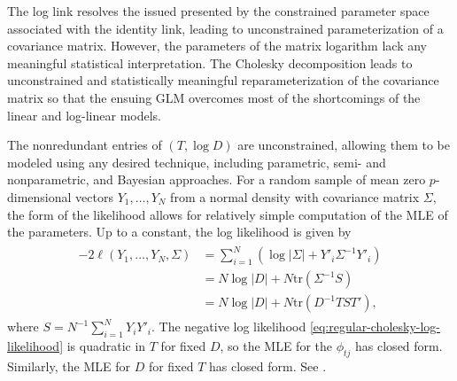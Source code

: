 The log link resolves the issued presented by the constrained parameter space associated with the identity link, leading to unconstrained parameterization of a covariance matrix. However, the parameters of the matrix logarithm lack any meaningful statistical interpretation. %
The Cholesky decomposition leads to unconstrained and statistically meaningful reparameterization of the covariance matrix so that the ensuing GLM overcomes most of the shortcomings of the linear and log-linear models.  %

%
The nonredundant entries of $\left(T, \log D\right)$ are unconstrained, allowing them to be modeled using any desired technique, including parametric, semi- and nonparametric, and Bayesian approaches. For a random sample of mean zero $p$-dimensional vectors $Y_1,\dots , Y_N$  from a normal density with covariance matrix $\Sigma$, the form of the likelihood allows for relatively simple computation of the MLE of the parameters. Up to a constant, the log likelihood is given by 
\begin{align}
\begin{split} \label{eq:regular-cholesky-log-likelihood}
-2\ell\left(Y_1,\dots, Y_N, \Sigma\right) &= \sum_{i = 1}^N \left( \log \vert \Sigma \vert  + Y'_i \Sigma^{-1}Y'_i\right) \\
&= N \log \vert D \vert + N \mbox{tr}\left(\Sigma^{-1}S\right) \\
& = N \log \vert D \vert + N \mbox{tr}\left(D^{-1}TST'\right), 
\end{split}
\end{align}
\noindent
where $S = N^{-1}\sum_{i=1}^N Y_iY'_i$. The negative log likelihood \eqref{eq:regular-cholesky-log-likelihood} is quadratic in $T$ for fixed $D$, so the MLE for the $\phi_{tj}$ has closed form. Similarly, the MLE for $D$ for fixed $T$ has closed form. See \cite{pourahmadi2000maximum}. 

